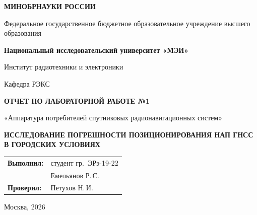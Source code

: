 \begin{titlepage}
    \centering
    {\bfseries МИНОБРНАУКИ РОССИИ\par}
    Федеральное государственное бюджетное образовательное учреждение высшего образования \\
    {\bfseries Национальный исследовательский университет «МЭИ»\par}
    \vspace{1cm}
    Институт радиотехники и электроники\par
    Кафедра РЭКС\par
    \vspace{3cm}
    
    {\bfseries\large ОТЧЕТ ПО ЛАБОРАТОРНОЙ РАБОТЕ №1\par}
    \vspace{0.5cm}
    {\large «Аппаратура потребителей спутниковых радионавигационных систем»\par}
    {\bfseries ИССЛЕДОВАНИЕ ПОГРЕШНОСТИ ПОЗИЦИОНИРОВАНИЯ НАП ГНСС В ГОРОДСКИХ УСЛОВИЯХ\par}
    
    \vspace{3.5cm}
 \vspace{1.5cm}
\noindent\hfill
\begin{tabular}{@{}ll@{}}
    \textbf{Выполнил:} & студент гр.~ЭРэ-19-22 \\
                        & Емельянов Р.\,С. \\[0.4cm]
    \textbf{Проверил:}  & Петухов Н.\,И.\\[0.4cm]
\end{tabular}   
    \vfill
    {Москва, 2026}
\end{titlepage}


